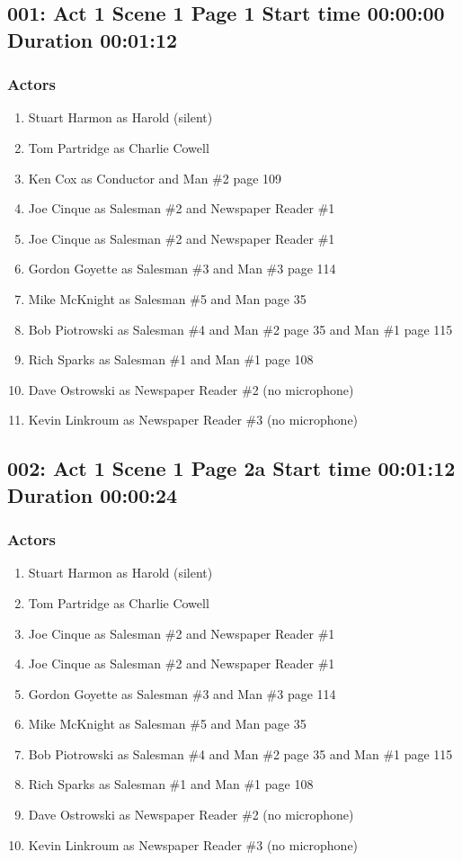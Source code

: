 \subsection{001: Act 1 Scene 1 Page 1 Start time 00:00:00 Duration 00:01:12}

\subsubsection{Actors}
\begin{enumerate}
\item Stuart Harmon as Harold (silent)
\item Tom Partridge as Charlie Cowell
\item Ken Cox as Conductor and Man \#2 page 109
\item Joe Cinque as Salesman \#2 and Newspaper Reader \#1
\item Joe Cinque as Salesman \#2 and Newspaper Reader \#1
\item Gordon Goyette as Salesman \#3 and Man \#3 page 114
\item Mike McKnight as Salesman \#5 and Man page 35
\item Bob Piotrowski as Salesman \#4 and Man \#2 page 35 and Man \#1 page 115
\item Rich Sparks as Salesman \#1 and Man \#1 page 108
\item Dave Ostrowski as Newspaper Reader \#2 (no microphone)
\item Kevin Linkroum as Newspaper Reader \#3 (no microphone)
\end{enumerate}


\subsection{002: Act 1 Scene 1 Page 2a Start time 00:01:12 Duration 00:00:24}

\subsubsection{Actors}
\begin{enumerate}
\item Stuart Harmon as Harold (silent)
\item Tom Partridge as Charlie Cowell
\item Joe Cinque as Salesman \#2 and Newspaper Reader \#1
\item Joe Cinque as Salesman \#2 and Newspaper Reader \#1
\item Gordon Goyette as Salesman \#3 and Man \#3 page 114
\item Mike McKnight as Salesman \#5 and Man page 35
\item Bob Piotrowski as Salesman \#4 and Man \#2 page 35 and Man \#1 page 115
\item Rich Sparks as Salesman \#1 and Man \#1 page 108
\item Dave Ostrowski as Newspaper Reader \#2 (no microphone)
\item Kevin Linkroum as Newspaper Reader \#3 (no microphone)
\end{enumerate}


